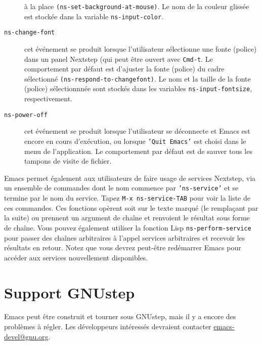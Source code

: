 \begin{description}
  à la place \texttt{(ns-set-background-at-mouse)}. Le nom de la
  couleur glissée est stockée dans la variable
  \texttt{ns-input-color}.
\item[\texttt{ns-change-font}] cet événement se produit lorsque
  l'utilisateur sélectionne une fonte (police) dans un panel Nextstep
  (qui peut être ouvert avec \texttt{Cmd-t}. Le comportement par
  défaut est d'ajuster la fonte (police) du cadre sélectionné
  \texttt{(ns-respond-to-changefont)}. Le nom et la taille de la fonte
  (police) sélectionnnée sont stockés dans les variables
  \texttt{ns-input-fontsize}, respectivement.
\item[\texttt{ns-power-off}] cet événement se produit lorsque
  l'utilisateur se déconnecte et Emacs est encore en cours
  d'exécution, ou lorsque \texttt{'Quit Emacs'} est choisi dans le
  menu de l'application. Le comportement par défaut est de sauver tous
  les tampons de visite de fichier.  
\end{description}
Emacs permet également aux utilisateurs de faire usage de services
Nextstep, via un ensemble de commandes dont le nom commence par
\texttt{'ns-service'} et se termine par le nom du service. Tapez
\texttt{M-x ns-service-TAB} pour voir la liste de ces commandes. Ces
fonctions opèrent soit sur le texte marqué (le remplaçant par la
suite) ou prennent un argument de chaîne et renvoient le résultat sous
forme de chaîne. Vous pouvez également utiliser la fonction Lisp
\texttt{ns-perform-service} pour passer des chaînes arbitraires à
l'appel services arbitraires et recevoir les résultats en
retour. Notez que vous devrez peut-être redémarrer Emacs pour accéder
aux services nouvellement disponibles.

\section{Support GNUstep}\label{appFsec4}
Emacs peut être construit et tourner sous GNUstep, mais il y a encore
des problèmes à régler. Les développeurs intéressés devraient
contacter \url{emacs-devel@gnu.org}.
